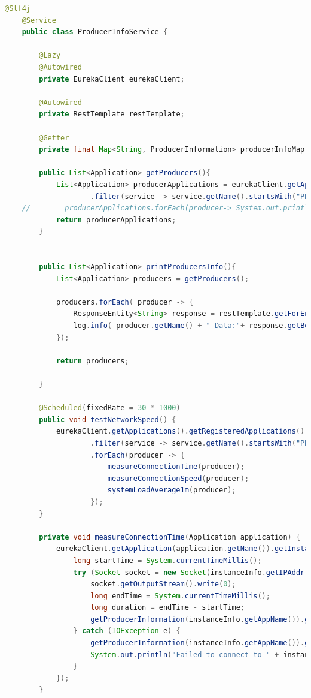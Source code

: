 \begin{lstlisting}[language=Java, caption=Kod usługi ProducerInfoService,label=ProducerInfoServiceCode]   
    @Slf4j
    @Service
    public class ProducerInfoService {
    
        @Lazy
        @Autowired
        private EurekaClient eurekaClient;
    
        @Autowired
        private RestTemplate restTemplate;
    
        @Getter
        private final Map<String, ProducerInformation> producerInfoMap = new HashMap<>();
    
        public List<Application> getProducers(){
            List<Application> producerApplications = eurekaClient.getApplications().getRegisteredApplications().stream()
                    .filter(service -> service.getName().startsWith("PRODUCER-")).toList();
    //        producerApplications.forEach(producer-> System.out.println(producer.getName()));
            return producerApplications;
        }
    
    
        public List<Application> printProducersInfo(){
            List<Application> producers = getProducers();
    
            producers.forEach( producer -> {
                ResponseEntity<String> response = restTemplate.getForEntity(producer.getInstances().get(0).getHomePageUrl()+"actuator/metrics",String.class);
                log.info( producer.getName() + " Data:"+ response.getBody());
            });
    
            return producers;
    
        }
    
        @Scheduled(fixedRate = 30 * 1000)
        public void testNetworkSpeed() {
            eurekaClient.getApplications().getRegisteredApplications().stream()
                    .filter(service -> service.getName().startsWith("PRODUCER-"))
                    .forEach(producer -> {
                        measureConnectionTime(producer);
                        measureConnectionSpeed(producer);
                        systemLoadAverage1m(producer);
                    });
        }
    
        private void measureConnectionTime(Application application) {
            eurekaClient.getApplication(application.getName()).getInstances().forEach(instanceInfo -> {
                long startTime = System.currentTimeMillis();
                try (Socket socket = new Socket(instanceInfo.getIPAddr(), instanceInfo.getPort())) {
                    socket.getOutputStream().write(0);
                    long endTime = System.currentTimeMillis();
                    long duration = endTime - startTime;
                    getProducerInformation(instanceInfo.getAppName()).getMeasurementBufferConnectionTime().addMeasurement(duration+1);
                } catch (IOException e) {
                    getProducerInformation(instanceInfo.getAppName()).getMeasurementBufferConnectionTime().addMeasurement(Double.MAX_VALUE);
                    System.out.println("Failed to connect to " + instanceInfo.getIPAddr() + ":" + instanceInfo.getPort() + "->  " + e.getMessage());
                }
            });
        }
    

\end{lstlisting}
